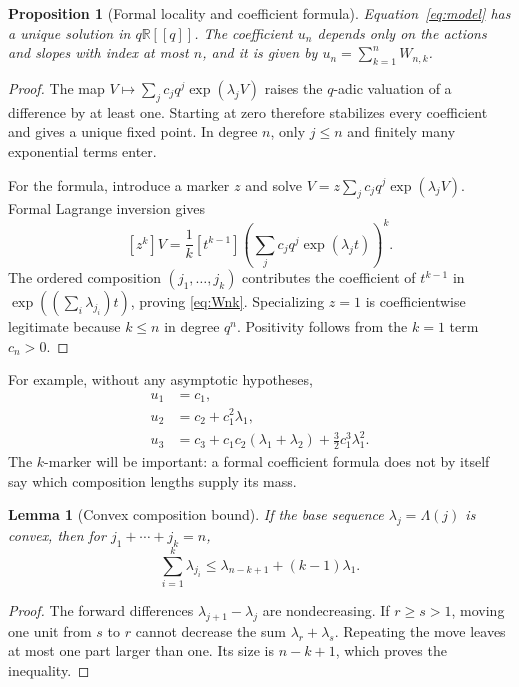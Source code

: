 \documentclass[11pt,a4paper]{article}
\numberwithin{equation}{section}
\newtheorem{proposition}[theorem]{Proposition}
\newtheorem{lemma}[theorem]{Lemma}
\theoremstyle{definition}
\theoremstyle{remark}
\newcommand{\R}{\mathbb R}
\begin{document}
\begin{proposition}[Formal locality and coefficient formula]
\label{prop:formal}
Equation~\eqref{eq:model} has a unique solution in $q\R[[q]]$.
The coefficient $u_n$ depends only on the actions and slopes with index
at most $n$, and it is given by $u_n=\sum_{k=1}^nW_{n,k}$.
\end{proposition}
\begin{proof}
The map $V\mapsto\sum_jc_jq^j\exp(\lambda_jV)$ raises the $q$-adic
valuation of a difference by at least one. Starting at zero therefore
stabilizes every coefficient and gives a unique fixed point. In degree
$n$, only $j\le n$ and finitely many exponential terms enter.

For the formula, introduce a marker $z$ and solve
$V=z\sum_jc_jq^j\exp(\lambda_jV)$. Formal Lagrange inversion gives
\[
 [z^k]V=\frac1k[t^{k-1}]
 \left(\sum_jc_jq^j\exp(\lambda_jt)\right)^k.
\]
The ordered composition $(j_1,\ldots,j_k)$ contributes the coefficient
of $t^{k-1}$ in $\exp((\sum_i\lambda_{j_i})t)$, proving
\eqref{eq:Wnk}. Specializing $z=1$ is coefficientwise legitimate because
$k\le n$ in degree $q^n$. Positivity follows from the $k=1$ term $c_n>0$.
\end{proof}

For example, without any asymptotic hypotheses,
\begin{align*}
 u_1&=c_1,\\
 u_2&=c_2+c_1^2\lambda_1,\\
 u_3&=c_3+c_1c_2(\lambda_1+\lambda_2)
            +\tfrac32c_1^3\lambda_1^2.
\end{align*}
The $k$-marker will be important: a formal coefficient formula does not
by itself say which composition lengths supply its mass.

\begin{lemma}[Convex composition bound]
\label{lem:convex}
If the base sequence $\lambda_j=\Lambda(j)$ is convex, then for
$j_1+\cdots+j_k=n$,
\begin{equation}
 \sum_{i=1}^k\lambda_{j_i}
 \le\lambda_{n-k+1}+(k-1)\lambda_1.
 \label{eq:convex-bound}
\end{equation}
\end{lemma}
\begin{proof}
The forward differences $\lambda_{j+1}-\lambda_j$ are nondecreasing.
If $r\ge s>1$, moving one unit from $s$ to $r$ cannot decrease the sum
$\lambda_r+\lambda_s$. Repeating the move leaves at most one part larger
than one. Its size is $n-k+1$, which proves the inequality.
\end{proof}
\end{document}
